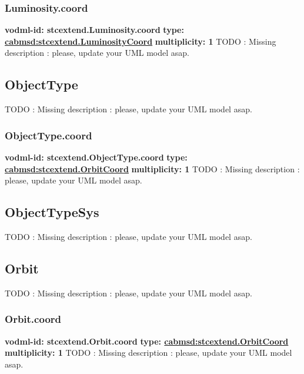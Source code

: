     \subsubsection{Luminosity.coord}
      \textbf{vodml-id: stcextend.Luminosity.coord} \newline
      \textbf{type: \hyperref[sect:stcextend.LuminosityCoord]{cabmsd:stcextend.LuminosityCoord}} \newline
      \textbf{multiplicity: 1} \newline 
      TODO : Missing description : please, update your UML model asap.

  \subsection{ObjectType}
  \label{sect:stcextend.ObjectType}
    TODO : Missing description : please, update your UML model asap.

    \subsubsection{ObjectType.coord}
      \textbf{vodml-id: stcextend.ObjectType.coord} \newline
      \textbf{type: \hyperref[sect:stcextend.OrbitCoord]{cabmsd:stcextend.OrbitCoord}} \newline
      \textbf{multiplicity: 1} \newline 
      TODO : Missing description : please, update your UML model asap.

  \subsection{ObjectTypeSys}
  \label{sect:stcextend.ObjectTypeSys}
    TODO : Missing description : please, update your UML model asap.

  \subsection{Orbit}
  \label{sect:stcextend.Orbit}
    TODO : Missing description : please, update your UML model asap.

    \subsubsection{Orbit.coord}
      \textbf{vodml-id: stcextend.Orbit.coord} \newline
      \textbf{type: \hyperref[sect:stcextend.OrbitCoord]{cabmsd:stcextend.OrbitCoord}} \newline
      \textbf{multiplicity: 1} \newline 
      TODO : Missing description : please, update your UML model asap.

